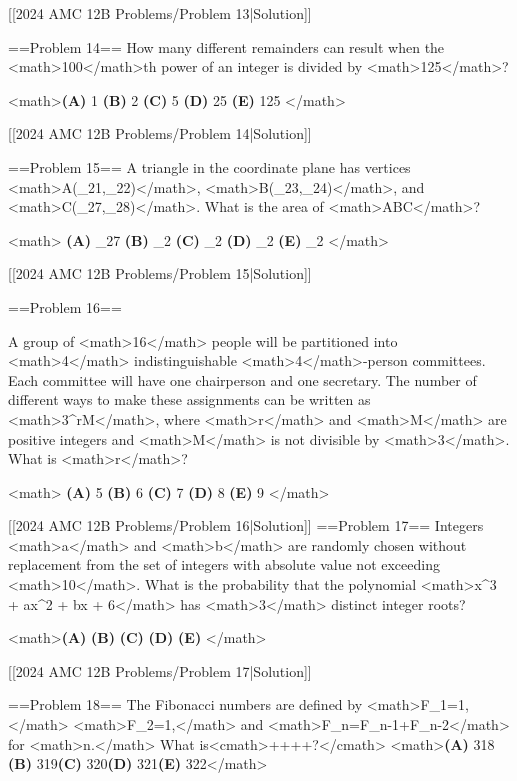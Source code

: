 [[2024 AMC 12B Problems/Problem 13|Solution]]

==Problem 14==
How many different remainders can result when the <math>100</math>th power of an integer is divided by <math>125</math>?

<math>\textbf{(A) }1 \qquad\textbf{(B) }2 \qquad\textbf{(C) }5 \qquad\textbf{(D) }25 \qquad\textbf{(E) }125 \qquad</math>

[[2024 AMC 12B Problems/Problem 14|Solution]]

==Problem 15==
A triangle in the coordinate plane has vertices <math>A(\log_21,\log_22)</math>, <math>B(\log_23,\log_24)</math>, and <math>C(\log_27,\log_28)</math>. What is the area of <math>\triangle ABC</math>?

<math>
\textbf{(A) }\log_27\qquad
\textbf{(B) }\log_2\qquad
\textbf{(C) }\log_2\qquad
\textbf{(D) }\log_2\qquad
\textbf{(E) }\log_2\qquad
</math>

[[2024 AMC 12B Problems/Problem 15|Solution]]

==Problem 16==

A group of <math>16</math> people will be partitioned into <math>4</math> indistinguishable <math>4</math>-person committees. Each committee will have one chairperson and one secretary. The number of different ways to make these assignments can be written as <math>3^{r}M</math>, where <math>r</math> and <math>M</math> are positive integers and <math>M</math> is not divisible by <math>3</math>. What is <math>r</math>?

<math>
\textbf{(A) }5 \qquad
\textbf{(B) }6 \qquad
\textbf{(C) }7 \qquad
\textbf{(D) }8 \qquad
\textbf{(E) }9 \qquad</math>

[[2024 AMC 12B Problems/Problem 16|Solution]]
==Problem 17==
Integers <math>a</math> and <math>b</math> are randomly chosen without replacement from the set of integers with absolute value not exceeding <math>10</math>. What is the probability that the polynomial <math>x^3 + ax^2 + bx + 6</math> has <math>3</math> distinct integer roots?

<math>\textbf{(A) } \qquad \textbf{(B) } \qquad \textbf{(C) } \qquad \textbf{(D) } \qquad \textbf{(E) }</math>

[[2024 AMC 12B Problems/Problem 17|Solution]]

==Problem 18==
The Fibonacci numbers are defined by <math>F_1=1,</math> <math>F_2=1,</math> and <math>F_n=F_{n-1}+F_{n-2}</math> for <math>n.</math> What is<cmath>+++\cdots+?</cmath>
<math>\textbf{(A) }318 \qquad\textbf{(B) }319\qquad\textbf{(C) }320\qquad\textbf{(D) }321\qquad\textbf{(E) }322</math>

